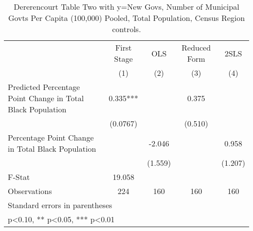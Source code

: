 \begin{table}[htbp]\centering
\def\sym#1{\ifmmode^{#1}\else\(^{#1}\)\fi}
\caption{Dererencourt Table Two with y=New Govs, Number of Municipal Govts Per Capita (100,000) Pooled, Total Population, Census Region controls.}
\begin{tabular}{l*{4}{c}}
\toprule
                    & First Stage   &         OLS   &Reduced Form   &        2SLS   \\
                    &\multicolumn{1}{c}{(1)}   &\multicolumn{1}{c}{(2)}   &\multicolumn{1}{c}{(3)}   &\multicolumn{1}{c}{(4)}   \\
\midrule
Predicted Percentage Point Change in Total Black Population&       0.335***&               &       0.375   &               \\
                    &    (0.0767)   &               &     (0.510)   &               \\
\addlinespace
Percentage Point Change in Total Black Population&               &      -2.046   &               &       0.958   \\
                    &               &     (1.559)   &               &     (1.207)   \\
\midrule
F-Stat              &      19.058   &               &               &               \\
Observations        &         224   &         160   &         160   &         160   \\
\bottomrule
\multicolumn{5}{l}{\footnotesize Standard errors in parentheses}\\
\multicolumn{5}{l}{\footnotesize * p<0.10, ** p<0.05, *** p<0.01}\\
\end{tabular}
\end{table}
